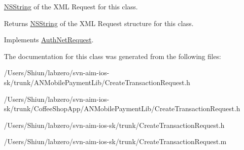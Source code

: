 \hyperlink{class_n_s_string}{NSString} of the XML Request for this class. 

\begin{DoxyReturn}{Returns}
\hyperlink{class_n_s_string}{NSString} of the XML Request structure for this class. 
\end{DoxyReturn}


Implements \hyperlink{interface_auth_net_request_aab99d065f49b7ed086b041c1c70e2975}{AuthNetRequest}.



The documentation for this class was generated from the following files:\begin{DoxyCompactItemize}
\item 
/Users/Shiun/labzero/svn-\/aim-\/ios-\/sk/trunk/ANMobilePaymentLib/CreateTransactionRequest.h\item 
/Users/Shiun/labzero/svn-\/aim-\/ios-\/sk/trunk/CoffeeShopApp/ANMobilePaymentLib/CreateTransactionRequest.h\item 
/Users/Shiun/labzero/svn-\/aim-\/ios-\/sk/trunk/CreateTransactionRequest.h\item 
/Users/Shiun/labzero/svn-\/aim-\/ios-\/sk/trunk/CreateTransactionRequest.m\end{DoxyCompactItemize}
